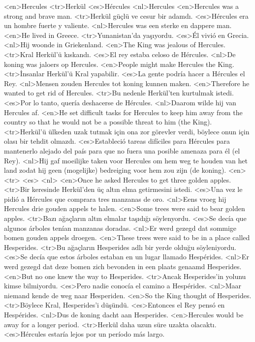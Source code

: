 <en>Hercules
<tr>Herkül
<es>Hércules
<nl>Hercules
<en>Hercules was a strong and brave man.
<tr>Herkül güçlü ve cesur bir adamdı.
<es>Hércules era un hombre fuerte y valiente.
<nl>Hercules was een sterke en dappere man.
<en>He lived in Greece.
<tr>Yunanistan'da yaşıyordu.
<es>Él vivió en Grecia.
<nl>Hij woonde in Griekenland.
<en>The King was jealous of Hercules.
<tr>Kral Herkül'ü kıskandı.
<es>El rey estaba celoso de Hércules.
<nl>De koning was jaloers op Hercules.
<en>People might make Hercules the King.
<tr>İnsanlar Herkül'ü Kral yapabilir.
<es>La gente podría hacer a Hércules el Rey.
<nl>Mensen zouden Hercules tot koning kunnen maken.
<en>Therefore he wanted to get rid of Hercules.
<tr>Bu nedenle Herkül'ten kurtulmak istedi.
<es>Por lo tanto, quería deshacerse de Hércules.
<nl>Daarom wilde hij van Hercules af.
<en>He set difficult tasks for Hercules to keep him away from the country so that he would not be a possible threat to him (the King).
<tr>Herkül'ü ülkeden uzak tutmak için ona zor görevler verdi, böylece onun için olası bir tehdit olmazdı.
<es>Estableció tareas difíciles para Hércules para mantenerlo alejado del país para que no fuera una posible amenaza para él (el Rey).
<nl>Hij gaf moeilijke taken voor Hercules om hem weg te houden van het land zodat hij geen (mogelijke) bedreiging voor hem zou zijn (de koning).
<en>
<tr>
<es>
<nl>
<en>Once he asked Hercules to get three golden apples.
<tr>Bir keresinde Herkül'den üç altın elma getirmesini istedi.
<es>Una vez le pidió a Hércules que comprara tres manzanas de oro.
<nl>Eens vroeg hij Hercules  drie gouden appels te halen.
<en>Some trees were said to bear golden apples.
<tr>Bazı ağaçların altın elmalar taşıdığı söylenyordu.
<es>Se decía que algunos árboles tenían manzanas doradas.
<nl>Er werd gezegd dat  sommige bomen gouden appels droegen.
<en>These trees were said to be in a place called Hesperides.
<tr>Bu ağaçların Hesperides adlı bir yerde olduğu söyleniyordu.
<es>Se decía que estos árboles estaban en un lugar llamado Hespérides.
<nl>Er werd  gezegd dat deze bomen zich  bevonden in een plaats genaamd Hesperides.
<en>But no one knew the way to Hesperides.
<tr>Ancak Hesperides'in yolunu kimse bilmiyordu.
<es>Pero nadie conocía el camino a Hespérides.
<nl>Maar niemand kende de weg naar Hesperiden.
<en>So the King thought of Hesperides.
<tr>Böylece Kral, Hesperides'i düşündü.
<es>Entonces el Rey pensó en Hespérides.
<nl>Dus de koning dacht aan Hesperides.
<en>Hercules would be away for a longer period.
<tr>Herkül daha uzun süre uzakta olacaktı.
<es>Hércules estaría lejos por un período más largo.
